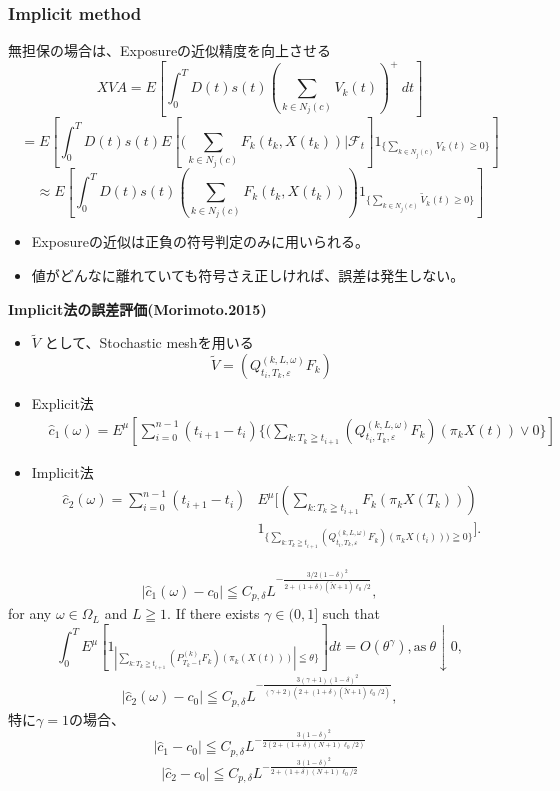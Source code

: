 \documentclass[driverfallback=dvipdfmx,cjk]{beamer}
\begin{document}
\begin{frame}\frametitle{Implicit method}
無担保の場合は、Exposureの近似精度を向上させる
$$ XVA = E[\int_0^T D(t)s(t)(\sum_{k \in N_j(c)}V_k(t))^+ \ dt] $$
$$ = E[ \int_0^T D(t) s(t) E [(\sum_{k \in N_j(c)} F_k(t_k, X(t_k)) | \mathcal{F}_t] 1_{\{\sum_{k \in N_j(c)} V_k(t) \ge 0 \}} ] $$
$$\approx E[ \int_0^T D(t) s(t) (\sum_{k \in N_j(c)} F_k(t_k, X(t_k)) ) 1_{\{\sum_{k \in N_j(c)} \tilde{V}_k(t) \ge 0 \}} ] $$
\begin{itemize}
    \item Exposureの近似は正負の符号判定のみに用いられる。
    \item 値がどんなに離れていても符号さえ正しければ、誤差は発生しない。
\end{itemize}
\end{frame}

\begin{frame}
    \textbf{Implicit法の誤差評価(Morimoto.2015)}
    \begin{itemize}
        \item $\tilde{V}$ として、Stochastic meshを用いる
         $$\tilde{V} = (Q_{t_i,T_k,\varepsilon}^{(k,L,\omega)}F_k)$$
        \item Explicit法
        \begin{align*}
            &\hat{c}_1(\omega) =E^{\mu} [ \sum_{i=0}^{n-1}(t_{i+1}-t_{i}) \{(\sum_{k:T_k\geqq t_{i+1}} (Q_{t_i,T_k,\varepsilon}^{(k,L,\omega)}F_k)(\pi_k{X}(t))\vee0\} ]
        \end{align*}
        \item Implicit法
        \begin{align*}
            \hat{c}_2(\omega)=\sum_{i=0}^{n-1}(t_{i+1}-t_{i}) &E^{\mu}[( \sum_{k:T_k\geqq t_{i+1}}F_k(\pi_k X(T_k))) \\
             &1_{\{\sum_{k:T_k\geqq t_{i+1}} (Q_{t_i,T_k,\varepsilon}^{(k,L,\omega)}F_k)(\pi_k X(t_i))) \geqq 0\}}].
        \end{align*}


    \end{itemize}
\end{frame}

\begin{frame}
    \begin{align*}
    |\hat{c}_1(\omega)-c_0| \leqq C_{p,\delta}L^{-\frac{3/2(1-\delta)^2}{2+(1+\delta)(\tilde{N}+1)\ell_0/2}},
    \end{align*}
    for any $\omega \in \Omega_{L}$ and $L \geqq 1$.
    If there exists $\gamma \in (0,1]$ such that
$$\int_0^T E^{\mu}[ 1_{| \sum_{k:T_k\geqq t_{i+1}} (P_{T_k-t}^{(k)}F_k)(\pi_k (X(t)))| \leqq \theta\} } ]dt =O(\theta^{\gamma}), \text{as} \ \theta \downarrow 0,$$
 \begin{align*}
 |\hat{c}_2(\omega)-c_0| \leqq C_{p,\delta}L^{-\frac{3(\gamma+1)(1-\delta)^2}{(\gamma+2)(2+(1+\delta)(\tilde{N}+1)\ell_0/2)}},
 \end{align*}
特に$\gamma = 1$の場合、
$$|\hat{c}_1 - c_0| \leqq C_{p,\delta}L^{-\frac{3(1-\delta)^2}{2(2+(1+\delta)(N+1)\ell_0/2)}}$$ 
$$|\hat{c}_2 - c_0| \leqq C_{p,\delta}L^{-\frac{3(1-\delta)^2}{2+(1+\delta)(N+1)\ell_0/2}}$$ 
\end{frame}
\end{document}
